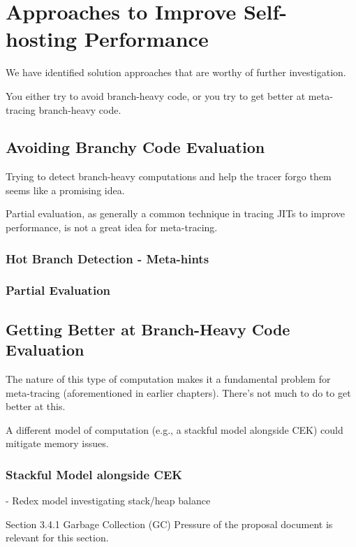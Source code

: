 \chapter{Approaches to Improve Self-hosting Performance}

	\label{chapter:solution}

	\begin{chapterpoint}
		We have identified solution approaches that are worthy of further investigation.

		You either try to avoid branch-heavy code, or you try to get better at meta-tracing branch-heavy code.
	\end{chapterpoint}

	\section{Avoiding Branchy Code Evaluation}
		\begin{mainpoint}
			Trying to detect branch-heavy computations and help the tracer forgo them seems like a promising idea.

			Partial evaluation, as generally a common technique in tracing JITs to improve performance, is not a great idea for meta-tracing.
		\end{mainpoint}
		\subsection{Hot Branch Detection - Meta-hints}
		\subsection{Partial Evaluation}

	\section{Getting Better at Branch-Heavy Code Evaluation}
		\begin{mainpoint}
			The nature of this type of computation makes it a fundamental problem for meta-tracing (aforementioned in earlier chapters). There's not much to do to get better at this.

			A different model of computation (e.g., a stackful model alongside CEK) could mitigate memory issues.
		\end{mainpoint}

		\subsection{Stackful Model alongside CEK}
		- Redex model investigating stack/heap balance

		\begin{todo}[Import]
			Section 3.4.1 Garbage Collection (GC) Pressure of the proposal document is relevant for this section.
		\end{todo}
